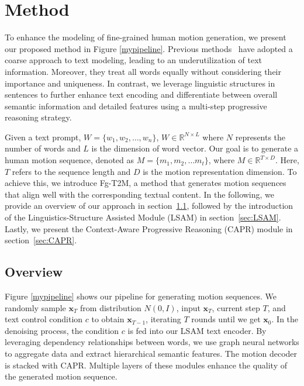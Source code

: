 \documentclass[10pt,twocolumn,letterpaper]{article}
\begin{document}
\section{Method}




To enhance the modeling of fine-grained human motion generation, we present our proposed method in Figure \ref{mypipeline}. Previous methods~\cite{ahn2018text2action,ahuja2019language2pose,ghosh2021synthesis} have adopted a coarse approach to text modeling, leading to an underutilization of text information. Moreover, they treat all words equally without considering their importance and uniqueness. In contrast, we leverage linguistic structures in sentences to further enhance text encoding and differentiate between overall semantic information and detailed features using a multi-step progressive reasoning strategy.

Given a text prompt, $W = \{w_1,w_2,\dots,w_n\} $, $W  \in \mathbb{R}^{N \times L}$ where $N$ represents the number of words and  $L$ is the dimension of word vector. 
Our goal is to generate a human motion sequence, denoted as $M = \{m_1,m_2,\dots m_t\}$, where $M \in \mathbb{R}^{T \times D}$. Here, $T$ refers to the sequence length and $D$ is the motion representation dimension. To achieve this, we introduce Fg-T2M, a method that generates motion sequences that align well with the corresponding textual content. In the following, we provide an overview of our approach in section~\ref{sec:architecture}, followed by the introduction of the Linguistics-Structure Assisted Module (LSAM) in section~\ref{sec:LSAM}. Lastly, we present the Context-Aware Progressive Reasoning (CAPR) module in section~\ref{sec:CAPR}.








\subsection{Overview}
\label{sec:architecture}




Figure \ref{mypipeline} shows our pipeline for generating motion sequences. We randomly sample $\mathbf{x}_T$ from distribution $N(0,I)$, input $\mathbf{x}_T$, current step $T$, and text control condition $c$ to obtain $\mathbf{x}_{T-1}$, iterating $T$ rounds until we get $\mathbf{x}_0$. In the denoising process, the condition $c$ is fed into our LSAM text encoder. By leveraging dependency relationships between words, we use graph neural networks to aggregate data and extract hierarchical semantic features. The motion decoder is stacked with CAPR. Multiple layers of these modules enhance the quality of the generated motion sequence.
\end{document}
